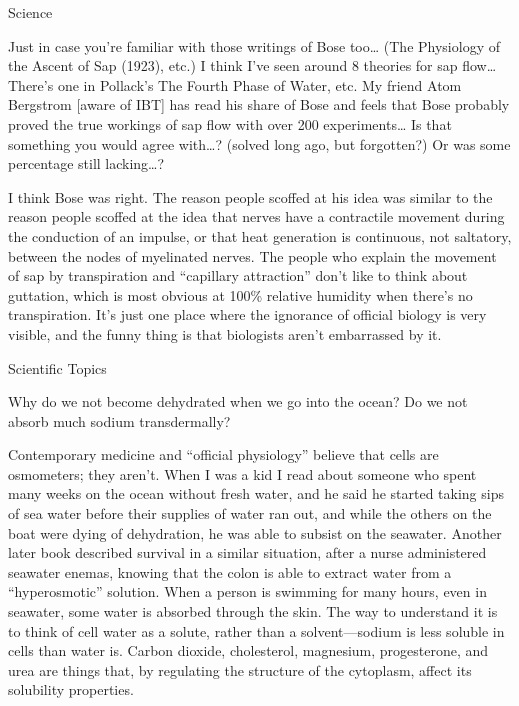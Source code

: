 \documentclass[11pt,oneside,openany,extrafontsizes]{memoir}
\begin{document}
\begin{emailexchange}{Science}

    \begin{question}
        Just in case you're familiar with those writings of Bose too\dots{} (The Physiology of the Ascent of Sap (1923), etc.) I think I've seen around 8 theories for sap flow\dots{} There's one in Pollack's The Fourth Phase of Water, etc. My friend Atom Bergstrom [aware of IBT] has read his share of Bose and feels that Bose probably proved the true workings of sap flow with over 200 experiments\dots{} Is that something you would agree with\dots{}? (solved long ago, but forgotten?) Or was some percentage still lacking\dots{}?
    \end{question}

    \begin{answer}
        I think Bose was right. The reason people scoffed at his idea was similar to the reason people scoffed at the idea that nerves have a contractile movement during the conduction of an impulse, or that heat generation is continuous, not saltatory, between the nodes of myelinated nerves. The people who explain the movement of sap by transpiration and \enquote{capillary attraction} don't like to think about guttation, which is most obvious at 100\% relative humidity when there's no transpiration. It's just one place where the ignorance of official biology is very visible, and the funny thing is that biologists aren't embarrassed by it.
    \end{answer}
\end{emailexchange}

\begin{qaexchange}{Scientific Topics}

    \begin{question}
        Why do we not become dehydrated when we go into the ocean? Do we not absorb much sodium transdermally?
    \end{question}

    \begin{answer}
      Contemporary medicine and \enquote{official physiology} believe that cells are osmometers; they aren't. When I was a kid I read about someone who spent many weeks on the ocean without fresh water, and he said he started taking sips of sea water before their supplies of water ran out, and while the others on the boat were dying of dehydration, he was able to subsist on the seawater. Another later book described survival in a similar situation, after a nurse administered seawater enemas, knowing that the colon is able to extract water from a \enquote{hyperosmotic} solution. When a person is swimming for many hours, even in seawater, some water is absorbed through the skin. The way to understand it is to think of cell water as a solute, rather than a solvent—sodium is less soluble in cells than water is. Carbon dioxide, cholesterol, magnesium, progesterone, and urea are things that, by regulating the structure of the cytoplasm, affect its solubility properties.
    \end{answer}
\end{qaexchange}
\end{document}
